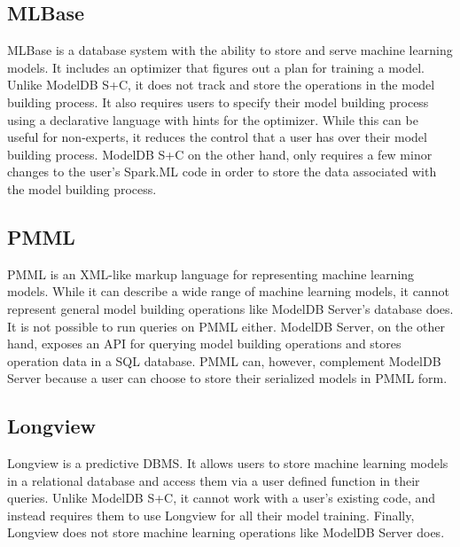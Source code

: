 \subsection{MLBase}
MLBase \cite{mlbase} is a database system with the ability to store and serve machine learning
models. It includes an optimizer that figures out a plan for training a model. Unlike ModelDB S+C,
it does not track and store the operations in the model building process. It also requires users to
specify their model building process using a declarative language with hints for the optimizer. While this
can be useful for non-experts, it reduces the control that a user has over their model building process.
ModelDB S+C on the other hand, only requires a few minor changes to the user's Spark.ML code in order to
store the data associated with the model building process.

\subsection{PMML}
PMML \cite{pmml} is an XML-like markup language for representing machine learning models. While it
can describe a wide range of machine learning models, it cannot represent general model building operations
like ModelDB Server's database does. It is not possible to run queries on PMML either. ModelDB Server, on the other hand,
exposes an API for querying model building operations and stores operation data in a SQL database. PMML can,
however, complement ModelDB Server because a user can choose to store their serialized models in PMML form.

\subsection{Longview}
Longview is a predictive DBMS. It allows users to store machine learning models in a relational database
and access them via a user defined function in their queries. Unlike ModelDB S+C, it
cannot work with a user's existing code, and instead requires them to use Longview for all their
model training. Finally, Longview does not store machine learning operations like ModelDB Server does.
